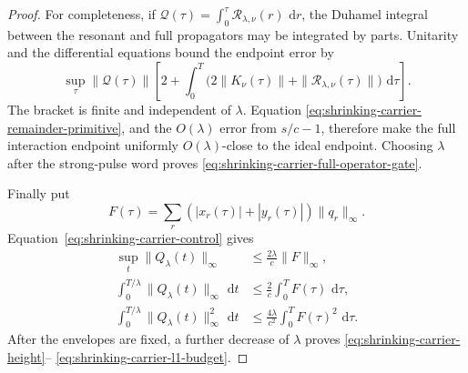 \documentclass[11pt]{article}
\theoremstyle{remark}
\newcommand{\dd}{\,\mathrm d}
\begin{document}
\begin{proof}
For completeness, if
$\mathcal Q(\tau)=\int_0^\tau\mathcal R_{\lambda,\nu}(r)\,\dd r$, the
Duhamel integral between the resonant and full propagators may be integrated
by parts.  Unitarity and the differential equations bound the endpoint
error by
\[
 \sup_\tau\|\mathcal Q(\tau)\|
 \left[
  2+\int_0^T
  \bigl(2\|K_\nu(\tau)\|+\|\mathcal R_{\lambda,\nu}(\tau)\|\bigr)
  \,\dd\tau
 \right].
\]
The bracket is finite and independent of $\lambda$.  Equation
\eqref{eq:shrinking-carrier-remainder-primitive}, and the
$O(\lambda)$ error from $s/c-1$, therefore make the full interaction
endpoint uniformly $O(\lambda)$-close to the ideal endpoint.  Choosing
$\lambda$ after the strong-pulse word proves
\eqref{eq:shrinking-carrier-full-operator-gate}.

Finally put
\[
 F(\tau)=\sum_r
 (|x_r(\tau)|+|y_r(\tau)|)\|q_r\|_\infty .
\]
Equation~\eqref{eq:shrinking-carrier-control} gives
\begin{align*}
 \sup_t\|Q_\lambda(t)\|_\infty
 &\leq\frac{2\lambda}{c}\|F\|_\infty,\\
 \int_0^{T/\lambda}\|Q_\lambda(t)\|_\infty\,\dd t
 &\leq\frac2c\int_0^TF(\tau)\,\dd\tau,\\
 \int_0^{T/\lambda}\|Q_\lambda(t)\|_\infty^2\,\dd t
 &\leq\frac{4\lambda}{c^2}\int_0^TF(\tau)^2\,\dd\tau.
 \end{align*}
After the envelopes are fixed, a further decrease of $\lambda$ proves
\eqref{eq:shrinking-carrier-height}--%
\eqref{eq:shrinking-carrier-l1-budget}.
\end{proof}
\end{document}
